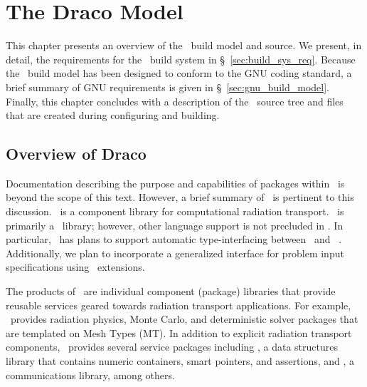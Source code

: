 
\chapter{The Draco Model}
\label{chap:model}

This chapter presents an overview of the \draco\ build model and
source.  We present, in detail, the requirements for the \draco\ build
system in \S~\ref{sec:build_sys_req}.  Because the \draco\ build model
has been designed to conform to the GNU coding standard, a brief
summary of GNU requirements is given in \S~\ref{sec:gnu_build_model}.
Finally, this chapter concludes with a description of the \draco\ 
source tree and files that are created during configuring and
building.


\section{Overview of Draco}
\label{sec:overview_of_draco}

Documentation describing the purpose and capabilities of packages
within \draco\ is beyond the scope of this text.  However, a brief
summary of \draco\ is pertinent to this discussion.  \draco\ is a
component library for computational radiation transport.  \draco\ is
primarily a \cpp\ library; however, other language support is not
precluded in \draco.  In particular, \draco\ has plans to support
automatic type-interfacing between \cpp\ and \fortran~\cite{gr99}.
Additionally, we plan to incorporate a generalized interface for
problem input specifications using \python\ extensions.

The products of \draco\ are individual component (package) libraries
that provide reusable services geared towards radiation transport
applications.  For example, \draco\ provides radiation physics, Monte
Carlo, and deterministic solver packages that are templated on Mesh
Types (MT).  In addition to explicit radiation transport components,
\draco\ provides several service packages including \dsxx, a data
structures library that contains numeric containers, smart pointers,
and assertions, and \cfour, a communications library, among others.

